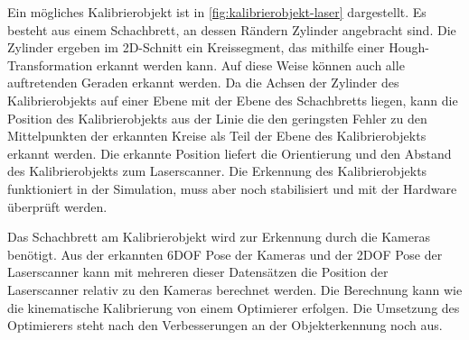 Ein mögliches Kalibrierobjekt ist in \ref{fig:kalibrierobjekt-laser} dargestellt.
Es besteht aus einem Schachbrett, an dessen Rändern Zylinder angebracht sind.
Die Zylinder ergeben im 2D-Schnitt ein Kreissegment, das mithilfe einer 
Hough-Transformation \cite{rohtua} erkannt werden kann. Auf diese Weise können 
auch alle 
auftretenden Geraden erkannt werden. 
Da die Achsen der 
Zylinder des Kalibrierobjekts auf einer Ebene mit der Ebene des Schachbretts liegen, kann die
Position des Kalibrierobjekts aus der Linie die den geringsten Fehler zu den
Mittelpunkten der erkannten Kreise als Teil der Ebene des Kalibrierobjekts
erkannt werden. Die erkannte Position liefert die Orientierung und den Abstand
des Kalibrierobjekts zum Laserscanner. Die Erkennung des Kalibrierobjekts
funktioniert in der Simulation, muss aber noch stabilisiert und mit der
Hardware überprüft werden.

Das Schachbrett am Kalibrierobjekt wird zur Erkennung durch die Kameras benötigt.
Aus der erkannten 6\ac{DOF} Pose der Kameras und der 2\ac{DOF} Pose der Laserscanner 
kann mit mehreren dieser Datensätzen die Position der Laserscanner relativ zu den
Kameras berechnet werden. Die Berechnung kann wie die kinematische Kalibrierung
von einem Optimierer erfolgen. Die Umsetzung des Optimierers steht nach den
Verbesserungen an der Objekterkennung noch aus. 

